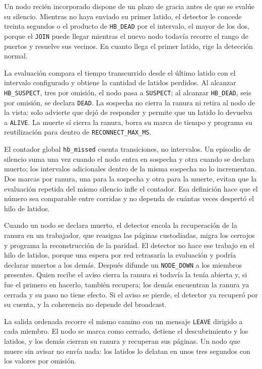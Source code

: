 Un nodo recién incorporado dispone de un plazo de gracia antes de que se evalúe su silencio. Mientras no haya enviado su primer latido, el detector le concede treinta segundos o el producto de \texttt{HB\_DEAD} por el intervalo, el mayor de los dos, porque el \texttt{JOIN} puede llegar mientras el nuevo nodo todavía recorre el rango de puertos y resuelve sus vecinos. En cuanto llega el primer latido, rige la detección normal.

La evaluación compara el tiempo transcurrido desde el último latido con el intervalo configurado y obtiene la cantidad de latidos perdidos. Al alcanzar \texttt{HB\_SUSPECT}, tres por omisión, el nodo pasa a \texttt{SUSPECT}; al alcanzar \texttt{HB\_DEAD}, seis por omisión, se declara \texttt{DEAD}. La sospecha no cierra la ranura ni retira al nodo de la vista: solo advierte que dejó de responder y permite que un latido lo devuelva a \texttt{ALIVE}. La muerte sí cierra la ranura, borra su marca de tiempo y programa su reutilización para dentro de \texttt{RECONNECT\_MAX\_MS}.

El contador global \texttt{hb\_missed} cuenta transiciones, no intervalos. Un episodio de silencio suma una vez cuando el nodo entra en sospecha y otra cuando se declara muerto; los intervalos adicionales dentro de la misma sospecha no lo incrementan. Dos marcas por ranura, una para la sospecha y otra para la muerte, evitan que la evaluación repetida del mismo silencio infle el contador. Esa definición hace que el número sea comparable entre corridas y no dependa de cuántas veces despertó el hilo de latidos.

Cuando un nodo se declara muerto, el detector encola la recuperación de la ranura en un trabajador, que reasigna las páginas custodiadas, migra los cerrojos y programa la reconstrucción de la paridad. El detector no hace ese trabajo en el hilo de latidos, porque una espera por red retrasaría la evaluación y podría declarar muertos a los demás. Después difunde un \texttt{NODE\_DOWN} a los miembros presentes. Quien recibe el aviso cierra la ranura si todavía la tenía abierta y, si fue el primero en hacerlo, también recupera; los demás encuentran la ranura ya cerrada y su paso no tiene efecto. Si el aviso se pierde, el detector ya recuperó por su cuenta, y la coherencia no depende del broadcast.

La salida ordenada recorre el mismo camino con un mensaje \texttt{LEAVE} dirigido a cada miembro. El nodo se marca como cerrado, detiene el descubrimiento y los latidos, y los demás cierran su ranura y recuperan sus páginas. Un nodo que muere sin avisar no envía nada: los latidos lo delatan en unos tres segundos con los valores por omisión.

